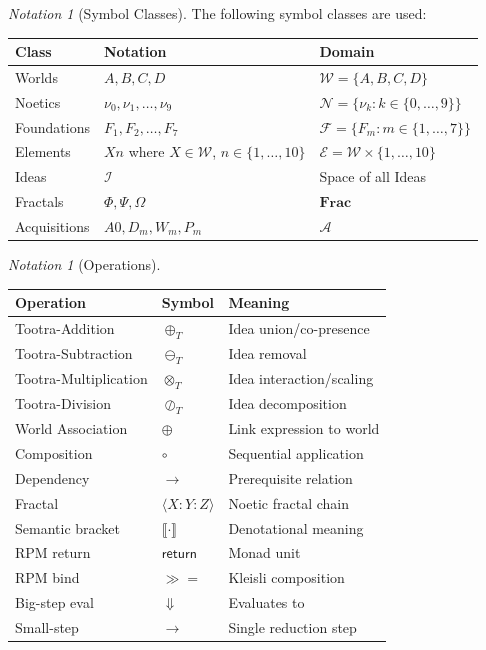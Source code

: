 \documentclass[11pt,twoside,openright]{book}
\theoremstyle{definition}
\theoremstyle{plain}
\theoremstyle{remark}
\newtheorem{notation}[definition]{Notation}
\newcommand{\sem}[1]{\llbracket #1 \rrbracket}
\newcommand{\Worlds}{\mathcal{W}}
\newcommand{\Ideas}{\mathcal{I}}
\newcommand{\Elements}{\mathcal{E}}
\newcommand{\Noetics}{\mathcal{N}}
\newcommand{\Foundations}{\mathcal{F}}
\newcommand{\Acquisitions}{\mathcal{A}}
\newcommand{\noe}[1]{\nu_{#1}}
\newcommand{\Tadd}{\oplus_T}
\newcommand{\Tsub}{\ominus_T}
\newcommand{\Tmul}{\otimes_T}
\newcommand{\Tdiv}{\oslash_T}
\newcommand{\rpmret}{\mathsf{return}}
\newcommand{\rpmbind}{\mathbin{\gg\!=}}
\newcommand{\Frac}{\Phi}
\newcommand{\FracSet}{\mathbf{Frac}}
\newcommand{\smallstep}{\to}
\newcommand{\bigstep}{\Downarrow}
\begin{document}
\begin{notation}[Symbol Classes]
\label{not:symbols}
The following symbol classes are used:
\begin{center}
\begin{tabular}{lll}
\toprule
\textbf{Class} & \textbf{Notation} & \textbf{Domain} \\
\midrule
Worlds & $A, B, C, D$ & $\Worlds = \{A, B, C, D\}$ \\
Noetics & $\noe{0}, \noe{1}, \ldots, \noe{9}$ & $\Noetics = \{\noe{k} : k \in \{0,\ldots,9\}\}$ \\
Foundations & $F_1, F_2, \ldots, F_7$ & $\Foundations = \{F_m : m \in \{1,\ldots,7\}\}$ \\
Elements & $Xn$ where $X \in \Worlds$, $n \in \{1,\ldots,10\}$ & $\Elements = \Worlds \times \{1,\ldots,10\}$ \\
Ideas & $\Ideas$ & Space of all Ideas \\
Fractals & $\Frac, \Psi, \Omega$ & $\FracSet$ \\
Acquisitions & $A0, D_m, W_m, P_m$ & $\Acquisitions$ \\
\bottomrule
\end{tabular}
\end{center}
\end{notation}

\begin{notation}[Operations]
\label{not:operations}
\begin{center}
\begin{tabular}{lll}
\toprule
\textbf{Operation} & \textbf{Symbol} & \textbf{Meaning} \\
\midrule
Tootra-Addition & $\Tadd$ & Idea union/co-presence \\
Tootra-Subtraction & $\Tsub$ & Idea removal \\
Tootra-Multiplication & $\Tmul$ & Idea interaction/scaling \\
Tootra-Division & $\Tdiv$ & Idea decomposition \\
World Association & $\oplus$ & Link expression to world \\
Composition & $\circ$ & Sequential application \\
Dependency & $\to$ & Prerequisite relation \\
Fractal & $\langle X : Y : Z \rangle$ & Noetic fractal chain \\
Semantic bracket & $\sem{\cdot}$ & Denotational meaning \\
RPM return & $\rpmret$ & Monad unit \\
RPM bind & $\rpmbind$ & Kleisli composition \\
Big-step eval & $\bigstep$ & Evaluates to \\
Small-step & $\smallstep$ & Single reduction step \\
\bottomrule
\end{tabular}
\end{center}
\end{notation}
\end{document}
